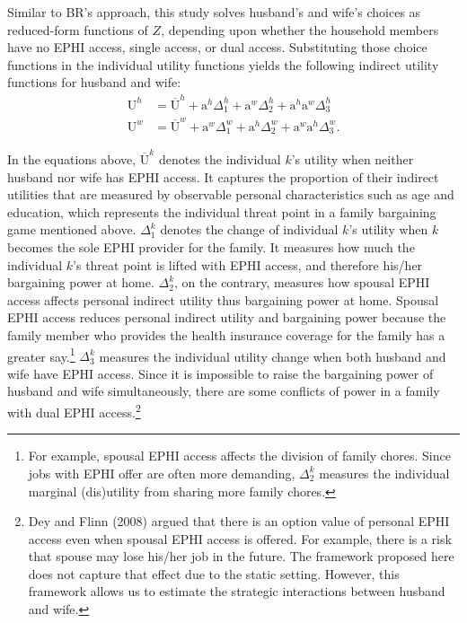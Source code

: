 \documentclass[legno,11pt]{article}
\begin{document}
Similar to BR's approach, this study solves husband's and wife's
choices as reduced-form functions of $Z$, depending upon whether the
household members have no EPHI access, single access, or dual
access. Substituting those choice functions in the individual utility
functions yields the following indirect utility functions for
husband and wife:
\begin{align}
\text{U}^{h}&= \overline{\text{U}}^{h}+\text{a}^{h}\Delta_{1}^{h}+\text{a}^{w}\Delta_{2}^{h}+\text{a}^{h}\text{a}^{w}\Delta_{3}^{h}\label{indirect_1}\\
\text{U}^{w}&=
\overline{\text{U}}^{w}+\text{a}^{w}\Delta_{1}^{w}+\text{a}^{h}\Delta_{2}^{w}+\text{a}^{w}\text{a}^{h}\Delta_{3}^{w}.\label{indirect_2}
\end{align}

In the equations above, $\overline{\text{U}}^{k}$ denotes the
individual $k$'s utility when neither husband nor wife has EPHI
access. It captures the proportion of their indirect utilities that are measured by observable personal characteristics such as age and education, which represents the individual threat point in a family bargaining game mentioned above. $\Delta_{1}^{k}$ denotes the change of individual $k$'s
utility when $k$ becomes the sole EPHI provider for the family. It measures how much the individual $k$'s threat point is lifted with EPHI access, and therefore his/her bargaining power at home. $\Delta_{2}^{k}$, on the contrary, measures how spousal EPHI access affects personal indirect utility thus bargaining power at home. Spousal EPHI access reduces personal indirect utility and bargaining power because the family member who provides the health insurance coverage for the family has a greater say.\footnote{For example, spousal EPHI access affects the division of family chores. Since jobs with EPHI offer are often more demanding, $\Delta_{2}^{k}$ measures the individual marginal (dis)utility from sharing more family chores.} $\Delta_{3}^{k}$ measures the individual utility change when
both husband and wife have EPHI access. Since it is impossible to raise the bargaining power of husband and wife simultaneously, there are some conflicts of power in a family with dual EPHI access.\footnote{Dey and Flinn (2008) argued that there is an option value of personal EPHI access even when spousal EPHI access is offered. For example, there is a risk that spouse may lose his/her job in the future. The framework proposed here does not capture that effect due to the static setting. However, this framework allows us to estimate the strategic interactions between husband and wife.}
\end{document}
